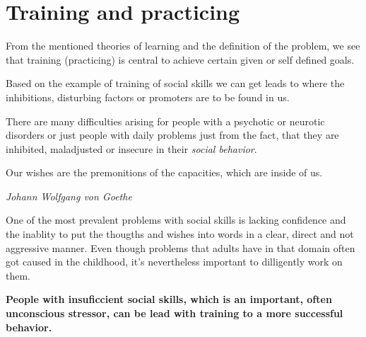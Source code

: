\documentclass[../main.tex]{subfiles}
\begin{document}
        \chapter{Training and practicing}

        From the mentioned theories of learning and the definition of the problem, we see that training (practicing) is central to achieve certain given or self defined goals.


        Based on the example of training of social skills we can get leads to where the inhibitions, disturbing factors or promoters are to be found in us.

        There are many difficulties arising for people with a psychotic or neurotic disorders or just people with daily problems just from the fact, that they are inhibited, maladjusted or insecure in their \emph{social behavior}.


\epigraph{Our wishes are the premonitions of the capacities, which are inside of us.}{\textit{Johann Wolfgang von Goethe}}

One of the most prevalent problems with social skills is lacking confidence and the inablity to put the thougths and wishes into words in a clear, direct and not aggressive manner. Even though problems that adults have in that domain often got caused in the childhood, it's nevertheless important to dilligently work on them.

\textbf{People with insuficcient social skills, which is an important, often unconscious stressor, can be lead with training to a more successful behavior.}

\vspace{1cm}

\end{document}

